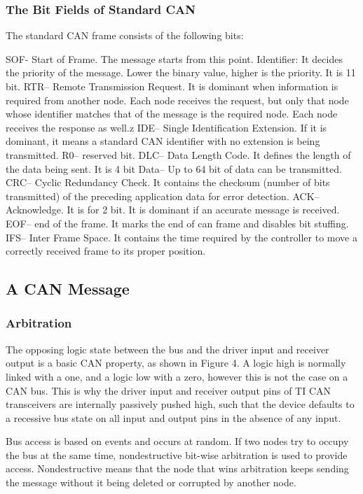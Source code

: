 \subsubsection{The Bit Fields of Standard CAN}

The standard CAN frame consists of the following bits:

SOF- Start of Frame. The message starts from this point.
Identifier: It decides the priority of the message. Lower the binary value, higher is the priority. It is 11 bit.
RTR– Remote Transmission Request. It is dominant when information is required from another node. Each node receives the request, but only that node whose identifier matches that of the message is the required node. Each node receives the response as well.z
IDE– Single Identification Extension. If it is dominant, it means a standard CAN identifier with no extension is being transmitted.
R0– reserved bit.
DLC– Data Length Code. It defines the length of the data being sent. It is 4 bit
Data– Up to 64 bit of data can be transmitted.
CRC– Cyclic Redundancy Check. It contains the checksum (number of bits transmitted) of the preceding application data for error detection.
ACK– Acknowledge. It is for 2 bit. It is dominant if an accurate message is received.
EOF– end of the frame. It marks the end of can frame and disables bit stuffing.
IFS– Inter Frame Space. It contains the time required by the controller to move a correctly received frame to its proper position.


\subsection{A CAN Message }
\subsubsection{Arbitration}

The opposing logic state between the bus and the driver input and receiver output is a basic CAN property, as shown in Figure 4. A logic high is normally linked with a one, and a logic low with a zero, however this is not the case on a CAN bus. This is why the driver input and receiver output pins of TI CAN transceivers are internally passively pushed high, such that the device defaults to a recessive bus state on all input and output pins in the absence of any input.

Bus access is based on events and occurs at random. If two nodes try to occupy the bus at the same time, nondestructive bit-wise arbitration is used to provide access. Nondestructive means that the node that wins arbitration keeps sending the message without it being deleted or corrupted by another node.

